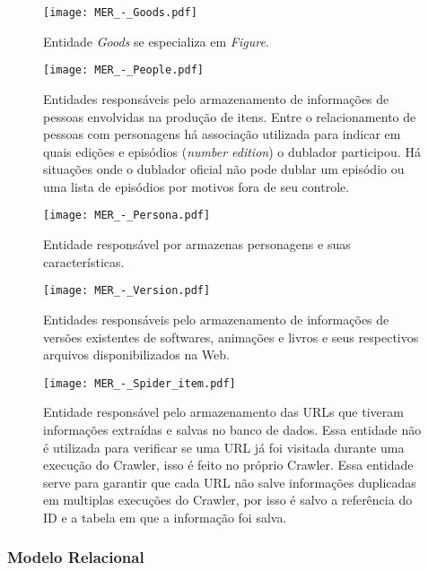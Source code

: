 \documentclass[12pt]{article}
\begin{document}
\begin{figure}[H]
\centering
\texttt{[image: MER\_-\_Goods.pdf]}
\caption{Entidade \textit{Goods} se especializa em \textit{Figure}.} \label{goods}
\end{figure}

\begin{figure}[H]
\centering
\texttt{[image: MER\_-\_People.pdf]}
\caption{Entidades responsáveis pelo armazenamento de informações de pessoas envolvidas na produção de itens. Entre o relacionamento de pessoas com personagens há associação utilizada para indicar em quais edições e episódios (\textit{number edition}) o dublador participou. Há situações onde o dublador oficial não pode dublar um episódio ou uma lista de episódios por motivos fora de seu controle.} \label{hash}
\end{figure}

\begin{figure}[H]
\centering
\texttt{[image: MER\_-\_Persona.pdf]}
\caption{Entidade responsável por armazenas personagens e suas características.} \label{Persona}
\end{figure}


\begin{figure}[H]
\centering
\texttt{[image: MER\_-\_Version.pdf]}
\caption{Entidades responsáveis pelo armazenamento de informações de versões existentes de softwares, animações e livros e seus respectivos arquivos disponibilizados na Web.} \label{hash}
\end{figure}


\begin{figure}[H]
\centering
\texttt{[image: MER\_-\_Spider\_item.pdf]}
\caption{Entidade responsável pelo armazenamento das URLs que tiveram informações extraídas e salvas no banco de dados. Essa entidade não é utilizada para verificar se uma URL já foi visitada durante uma execução do Crawler, isso é feito no próprio Crawler. Essa entidade serve para garantir que cada URL não salve informações duplicadas em multiplas execuções do Crawler, por isso é salvo a referência do ID e a tabela em que a informação foi salva.} \label{hash}
\end{figure}

\subsubsection{Modelo Relacional}
\end{document}
